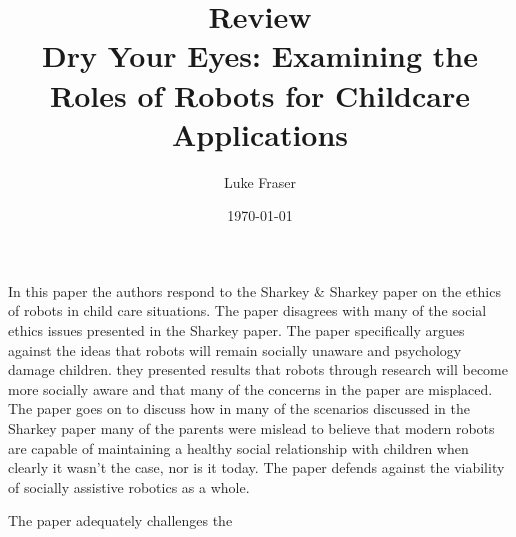 \documentclass{article}
\begin{document}
\title{{\large Review} \\ Dry Your Eyes: Examining the Roles of Robots for Childcare Applications}
\author{Luke Fraser}
\date{\today}
\maketitle

\begingroup
\renewcommand{\section}[2]{}


\endgroup

\section*{Summary}
In this paper the authors respond to the Sharkey & Sharkey paper on the ethics of robots in child care situations. The paper disagrees with many of the social ethics issues presented in the Sharkey paper. The paper specifically argues against the ideas that robots will remain socially unaware and psychology damage children. they presented results that robots through research will become more socially aware and that many of the concerns in the paper are misplaced. The paper goes on to discuss how in many of the scenarios discussed in the Sharkey paper many of the parents were mislead to believe that modern robots are capable of maintaining a healthy social relationship with children when clearly it wasn't the case, nor is it today. The paper defends against the viability of socially assistive robotics as a whole.
\section*{Strengths}
The paper adequately challenges the 
\section*{Critique}

\cite{Feil-seifer_dryyour}
\end{document}
